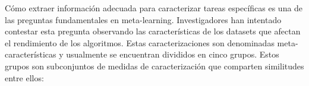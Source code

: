 
Cómo extraer información adecuada para caracterizar tareas específicas es una de las preguntas fundamentales en meta-learning. Investigadores han intentado contestar esta pregunta observando las características de los datasets que afectan el rendimiento de los algoritmos. Estas caracterizaciones son denominadas meta-características y usualmente se encuentran divididos en cinco grupos. Estos grupos son subconjuntos de medidas de caracterización \cite{bradzil2009metalearning} que comparten similitudes entre ellos:


